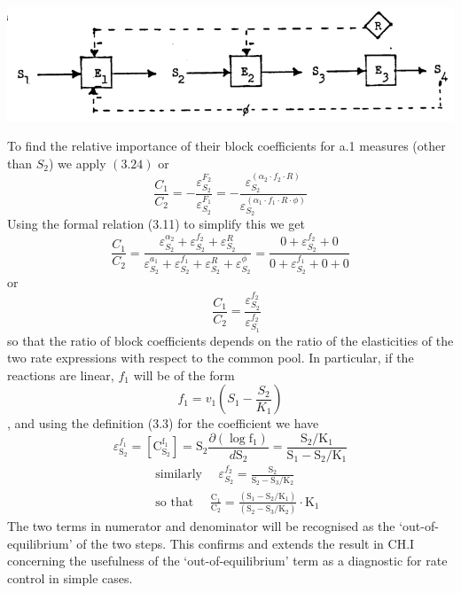 \begin{center}
\includegraphics[max width=\textwidth]{figure3_324.png}
\end{center}

To find the relative importance of their block coefficients for a.1 measures (other than $S_2$) we apply $\left(3.24\right)$ or
%
$$ \frac{C_1}{C_2} = -\frac{\varepsilon_{S_2}^{F_2}}{\varepsilon_{S_2}^{F_1}} = -\frac{\varepsilon_{S_2}^{\left(\alpha_2 \cdot f_2 \cdot R\right)}}{\varepsilon_{S_2}^{\left(\alpha_1 \cdot f_1 \cdot R \cdot \phi\right)}} $$
%
Using the formal relation (3.11) to simplify this we get
%
$$
\frac{C_{1}}{C_{2}}=\frac{\varepsilon_{S_{2}}^{\alpha_{2}}+\varepsilon_{S_{2}}^{f_{2}}+\varepsilon_{S_{2}}^{R}}{\varepsilon_{S_{2}}^{a_{1}}+\varepsilon_{S_{2}}^{f_{1}}+\varepsilon_{S_{2}}^{R}+\varepsilon^\phi_{S_{2}}} = \frac{0+\varepsilon_{S_{2}}^{f_{2}}+0}{0+\varepsilon_{S_{2}}^{f_{1}}+0+0}
$$
%
or
%
$$\quad \frac{C_{1}}{C_{2}}=\frac{\varepsilon_{S_{2}}^{f_{2}}}{\varepsilon_{S_{1}}^{f_{2}}}$$
%
so that the ratio of block coefficients depends on the ratio of the elasticities of the two rate expressions with respect to the common pool. In particular, if the reactions are linear, $f_{1}$ will be of the form
%
$$ f_{1}= v_{1}\left(S_{1}-\frac{S_{2}}{K_{1}}\right)$$,
%
and using the definition (3.3) for the coefficient we have
%
$$
\varepsilon_\mathrm{S_2}^{f_1} = \left[\mathrm{C}^{\mathrm{f}_{1}}_{\mathrm{S}_{2}}\right] = \mathrm{S_2} \frac{\partial\left(\log \mathrm{f}_{1}\right)}{d\mathrm{S}_{2}}=\frac{\mathrm{S}_{2} / \mathrm{K}_{1}}{\mathrm{S}_{1}-\mathrm{S}_{2} / \mathrm{K}_{1}}
$$
%
$$
\begin{aligned}
& \text { similarly } \quad \varepsilon^{f_2}_{S_2} = \frac{\mathrm{S}_{2}}{\mathrm{S}_{2} - \mathrm{S}_{3} / \mathrm{K}_{2}} \\[5pt]
& \text { so that } \quad \frac{\mathrm{C}_{1}}{\mathrm{C}_{2}}=\frac{\left(\mathrm{S}_{1}-\mathrm{S}_{2} / \mathrm{K}_{1}\right)}{\left(\mathrm{S}_{2}-\mathrm{S}_{3} / \mathrm{K}_{2}\right)} \cdot \mathrm{K}_{1}
\end{aligned}
$$
%
The two terms in numerator and denominator will be recognised as the `out-of-equilibrium' of the two steps. This confirms and extends the result in CH.I concerning the usefulness of the `out-of-equilibrium' term as a diagnostic for rate control in simple cases.

